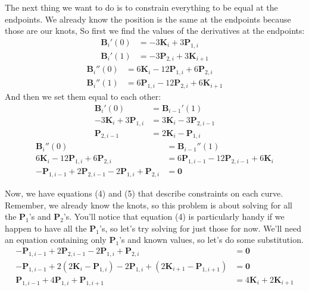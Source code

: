 \documentclass[10pt]{article}
\renewcommand{\vec}[1]{\mathbf{#1}}
\begin{document}
	The next thing we want to do is to constrain everything to be equal at the
	endpoints. We already know the position is the same at the endpoints because
	those are our knots, So first we find the values of the derivatives at the
	endpoints:
	\begin{align*}
		\vec{B}_{i}'(0) &= -3\vec{K}_{i} + 3\vec{P}_{1,i}\\
		\vec{B}_{i}'(1) &= -3\vec{P}_{2,i} + 3\vec{K}_{i+1}
	\end{align*}
	\begin{align*}
		\vec{B}_{i}''(0) &= 6\vec{K}_{i} - 12\vec{P}_{1,i} + 6\vec{P}_{2,i}\\
		\vec{B}_{i}''(1) &= 6\vec{P}_{1,i} - 12\vec{P}_{2,i} + 6\vec{K}_{i+1}
	\end{align*}
	And then we set them equal to each other:
	\begin{align}
		\vec{B}_{i}'(0) &= \vec{B}_{i-1}'(1)\nonumber\\
		-3\vec{K}_{i} + 3\vec{P}_{1,i} &= 3\vec{K}_{i} - 3\vec{P}_{2,i-1}\nonumber\\
		\vec{P}_{2,i-1} &= 2\vec{K}_{i} - \vec{P}_{1,i}
	\end{align}
	\begin{align}
		\vec{B}_{i}''(0) &= \vec{B}_{i-1}''(1)\nonumber\\
		6\vec{K}_{i} - 12\vec{P}_{1,i} + 6\vec{P}_{2,i} &= 6\vec{P}_{1,i-1} - 12\vec{P}_{2,i-1} + 6\vec{K}_{i}\nonumber\\
		-\vec{P}_{1,i-1} + 2\vec{P}_{2,i-1} - 2\vec{P}_{1,i} + \vec{P}_{2,i} &= \vec{0}
	\end{align}

	Now, we have equations (4) and (5) that describe constraints on each curve.
	Remember, we already know the knots, so this problem is about solving for
	all the $\vec{P}_{1}$'s and $\vec{P}_{2}$'s. You'll notice that equation (4)
	is particularly handy if we happen to have all the $\vec{P}_{1}$'s, so let's
	try solving for just those for now. We'll need an equation containing only
	$\vec{P}_{1}$'s and known values, so let's do some substitution.
	\begin{align}
		-\vec{P}_{1,i-1} + 2\vec{P}_{2,i-1} - 2\vec{P}_{1,i} + \vec{P}_{2,i} &= \vec{0}\nonumber\\
		-\vec{P}_{1,i-1} + 2(2\vec{K}_{i} - \vec{P}_{1,i}) - 2\vec{P}_{1,i} + (2\vec{K}_{i+1} - \vec{P}_{1,i+1}) &= \vec{0}\nonumber\\
		\vec{P}_{1,i-1} + 4\vec{P}_{1,i} + \vec{P}_{1,i+1} &= 4\vec{K}_{i} + 2\vec{K}_{i+1}
	\end{align}
\end{document}
